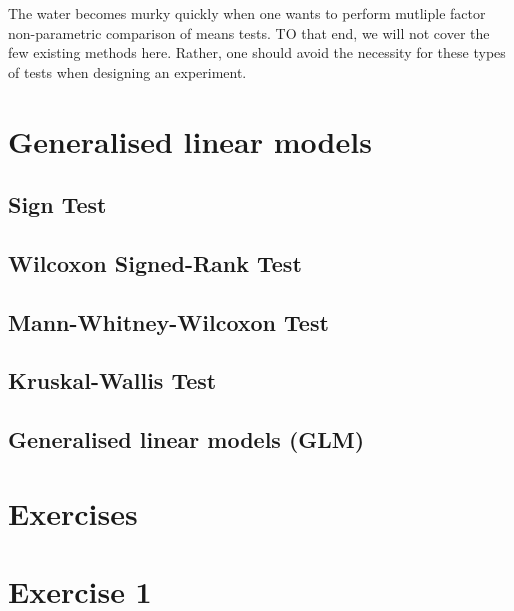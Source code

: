 \documentclass[english,10pt,a4paper,oneside]{book}
\theoremstyle{definition}
\theoremstyle{definition}
\theoremstyle{definition}
\theoremstyle{remark}
\begin{document}
The water becomes murky quickly when one wants to perform mutliple
factor non-parametric comparison of means tests. TO that end, we will
not cover the few existing methods here. Rather, one should avoid the
necessity for these types of tests when designing an experiment.

\hypertarget{generalised-linear-models}{%
\section{Generalised linear models}\label{generalised-linear-models}}

\hypertarget{sign-test}{%
\subsection{Sign Test}\label{sign-test}}

\hypertarget{wilcoxon-signed-rank-test}{%
\subsection{Wilcoxon Signed-Rank Test}\label{wilcoxon-signed-rank-test}}

\hypertarget{mann-whitney-wilcoxon-test}{%
\subsection{Mann-Whitney-Wilcoxon
Test}\label{mann-whitney-wilcoxon-test}}

\hypertarget{kruskal-wallis-test}{%
\subsection{Kruskal-Wallis Test}\label{kruskal-wallis-test}}

\hypertarget{generalised-linear-models-glm}{%
\subsection{Generalised linear models
(GLM)}\label{generalised-linear-models-glm}}

\hypertarget{exercises-7}{%
\section{Exercises}\label{exercises-7}}

\hypertarget{exercise-1-7}{%
\section{Exercise 1}\label{exercise-1-7}}
\end{document}
